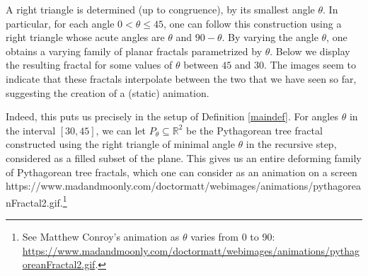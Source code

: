 \documentclass[12 pt]{article}
\newcommand{\bR}{\mathbb{R}}
\begin{document}
\begin{center}
\end{center}
A right triangle is determined (up to congruence), by its smallest angle $\theta$.  In particular, for each angle $0<\theta\le45$, one can follow this construction using a right triangle whose acute angles are $\theta$ and $90-\theta$.  By varying the angle $\theta$, one obtains a varying family of planar fractals parametrized by $\theta$.  Below we display the resulting fractal for some values of $\theta$ between $45$ and $30$.  The images seem to indicate that these fractals interpolate between the two that we have seen so far, suggesting the creation of a (static) animation.
\begin{center}
\end{center}
Indeed, this puts us precisely in the setup of Definition \ref{maindef}.  For angles $\theta$ in the interval $[30,45]$, we can let $P_\theta\subseteq\bR^2$ be the Pythagorean tree fractal constructed using the right triangle of minimal angle $\theta$ in the recursive step, considered as a filled subset of the plane.  This gives us an entire deforming family of Pythagorean tree fractals, which one can consider as an animation on a screen https://www.madandmoonly.com/doctormatt/webimages/animations/pythagoreanFractal2.gif.\footnote{See Matthew Conroy's animation as $\theta$ varies from 0 to 90: \url{https://www.madandmoonly.com/doctormatt/webimages/animations/pythagoreanFractal2.gif}.}\\
\end{document}
